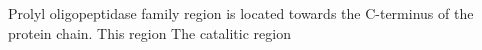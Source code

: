 Prolyl oligopeptidase family region is located towards the C-terminus of the protein chain. This region The catalitic region 